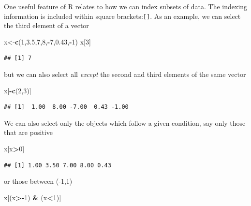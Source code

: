\documentclass[]{book}
\newenvironment{Shaded}{\begin{snugshade}}{\end{snugshade}}
\newcommand{\KeywordTok}[1]{\textcolor[rgb]{0.13,0.29,0.53}{\textbf{#1}}}
\newcommand{\DecValTok}[1]{\textcolor[rgb]{0.00,0.00,0.81}{#1}}
\newcommand{\FloatTok}[1]{\textcolor[rgb]{0.00,0.00,0.81}{#1}}
\newcommand{\StringTok}[1]{\textcolor[rgb]{0.31,0.60,0.02}{#1}}
\newcommand{\OperatorTok}[1]{\textcolor[rgb]{0.81,0.36,0.00}{\textbf{#1}}}
\newcommand{\NormalTok}[1]{#1}
\theoremstyle{definition}
\theoremstyle{definition}
\theoremstyle{remark}
\begin{document}
One useful feature of R relates to how we can index subsets of data. The
indexing information is included within square brackets:\texttt{{[}{]}}.
As an example, we can select the third element of a vector

\begin{Shaded}
\begin{Highlighting}[]
\NormalTok{x<-}\KeywordTok{c}\NormalTok{(}\DecValTok{1}\NormalTok{,}\FloatTok{3.5}\NormalTok{,}\DecValTok{7}\NormalTok{,}\DecValTok{8}\NormalTok{,}\OperatorTok{-}\DecValTok{7}\NormalTok{,}\FloatTok{0.43}\NormalTok{,}\OperatorTok{-}\DecValTok{1}\NormalTok{)}
\NormalTok{x[}\DecValTok{3}\NormalTok{]}
\end{Highlighting}
\end{Shaded}

\begin{verbatim}
## [1] 7
\end{verbatim}

but we can also select all \emph{except} the second and third elements
of the same vector

\begin{Shaded}
\begin{Highlighting}[]
\NormalTok{x[}\OperatorTok{-}\KeywordTok{c}\NormalTok{(}\DecValTok{2}\NormalTok{,}\DecValTok{3}\NormalTok{)]}
\end{Highlighting}
\end{Shaded}

\begin{verbatim}
## [1]  1.00  8.00 -7.00  0.43 -1.00
\end{verbatim}

We can also select only the objects which follow a given condition, say
only those that are positive

\begin{Shaded}
\begin{Highlighting}[]
\NormalTok{x[x}\OperatorTok{>}\DecValTok{0}\NormalTok{]}
\end{Highlighting}
\end{Shaded}

\begin{verbatim}
## [1] 1.00 3.50 7.00 8.00 0.43
\end{verbatim}

or those between (-1,1)

\begin{Shaded}
\begin{Highlighting}[]
\NormalTok{x[(x}\OperatorTok{>-}\DecValTok{1}\NormalTok{) }\OperatorTok{&}\StringTok{ }\NormalTok{(x}\OperatorTok{<}\DecValTok{1}\NormalTok{)]}
\end{Highlighting}
\end{Shaded}
\end{document}
